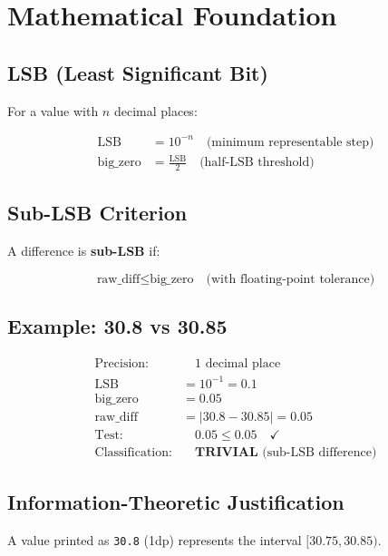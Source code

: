 \documentclass[11pt]{article}
\begin{document}
\section{Mathematical Foundation}

\subsection{LSB (Least Significant Bit)}

For a value with $n$ decimal places:

\begin{align}
    \text{LSB} &= 10^{-n} \quad \text{(minimum representable step)} \\
    \text{big\_zero} &= \frac{\text{LSB}}{2} \quad \text{(half-LSB threshold)}
\end{align}

\subsection{Sub-LSB Criterion}

A difference is \textbf{sub-LSB} if:

\begin{equation}
    \text{raw\_diff} \leq \text{big\_zero} \quad \text{(with floating-point tolerance)}
\end{equation}

\subsection{Example: 30.8 vs 30.85}

\begin{align*}
    \text{Precision:} & \quad 1 \text{ decimal place} \\
    \text{LSB} &= 10^{-1} = 0.1 \\
    \text{big\_zero} &= 0.05 \\
    \text{raw\_diff} &= |30.8 - 30.85| = 0.05 \\
    \text{Test:} & \quad 0.05 \leq 0.05 \quad \checkmark \\
    \text{Classification:} & \quad \textbf{TRIVIAL} \text{ (sub-LSB difference)}
\end{align*}

\subsection{Information-Theoretic Justification}

A value printed as \texttt{30.8} (1dp) represents the interval $[30.75, 30.85)$.
\end{document}
